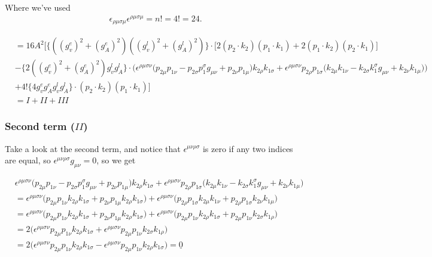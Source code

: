 \documentclass[11pt]{article}
\begin{document}
\begin{center}
Where we've used
\begin{align*}
\epsilon_{\rho \mu \sigma \mu} \epsilon^{\rho \mu \sigma \mu} = n! = 4! = 24. 
\end{align*}
\end{center}
\begin{align*}
&= 16 A^2 \Big[
 \{((g_v^e)^2 + (g_A^e)^2)  ((g_v^l)^2 + (g_A^l)^2)\} \cdot
\Big[ 2(p_2 \cdot k_2) (p_1 \cdot k_1) + 2(p_1 \cdot k_2) (p_2 \cdot k_1) \Big]\\
 &-
\{2 ((g_v^e)^2 + (g_A^e)^2) g_v^l g_A^l \} \cdot
\Big( \epsilon^{\rho \mu \sigma \nu}  \big(
p_{2\mu} p_{1 \nu} - p_{2\sigma} p_1^{ \sigma} g_{\mu\nu}
+ p_{2\nu} p_{1 \mu} \big) k_{2 \rho} k_{1 \sigma} 
+ \epsilon^{\rho \mu \sigma \nu} p_{2 \rho}  p_{1 \sigma}  \big(k_{2 \mu} k_{1 \nu}  - k_{2 \sigma} k_1^{ \sigma} g_{\mu \nu} + k_{2 \nu} k_{1 \mu}\big) \Big)\\
& +
4! \{4  g_v^e g_A^e g_v^l g_A^l  \} \cdot
(p_2 \cdot k_2) (p_1 \cdot k_1)
\Big]\\
&= I + II + III
\end{align*}

\subsubsection{Second term ($II$)}
\begin{center}
Take a look at the second term, and notice that $\epsilon^{\mu\nu \rho \sigma}$ is zero if any two indices are equal, so $\epsilon^{\mu \nu \rho \sigma} g_{\mu \nu}=0$, so we get
\begin{flushleft}
\begin{align*}
&  \epsilon^{\rho \mu \sigma \nu}  \big(
p_{2\mu} p_{1 \nu} - p_{2\sigma} p_1^{ \sigma} g_{\mu\nu}
+ p_{2\nu} p_{1 \mu} \big) k_{2 \rho} k_{1 \sigma} 
+ \epsilon^{\rho \mu \sigma \nu} p_{2 \rho}  p_{1 \sigma}  \big(k_{2 \mu} k_{1 \nu}  - k_{2 \sigma} k_1^{ \sigma} g_{\mu \nu} + k_{2 \nu} k_{1 \mu}\big) \\
&= \epsilon^{\rho \mu \sigma \nu}  \big(
p_{2\mu} p_{1 \nu}k_{2 \rho} k_{1 \sigma} 
+ p_{2\nu} p_{1 \mu} k_{2 \rho} k_{1 \sigma} \big) + \epsilon^{\rho \mu \sigma \nu} \big(
 p_{2 \rho}  p_{1 \sigma} k_{2 \mu} k_{1 \nu}  + p_{2 \rho}  p_{1 \sigma}  k_{2 \nu} k_{1 \mu}\big) \\
&= \epsilon^{\rho \mu \sigma \nu}  \big(
p_{2\mu} p_{1 \nu}k_{2 \rho} k_{1 \sigma} 
+ p_{2\nu} p_{1 \mu} k_{2 \rho} k_{1 \sigma} \big) + \epsilon^{\rho \mu  \sigma \nu } \big(
p_{2 \mu}  p_{1 \nu} k_{2 \rho} k_{1 \sigma}  + p_{2 \mu}  p_{1 \nu}  k_{2 \sigma} k_{1 \rho}\big) \\
&= 2 \big( \epsilon^{\rho \mu  \sigma \nu } 
p_{2 \mu}  p_{1 \nu} k_{2 \rho} k_{1 \sigma}  + \epsilon^{\rho \mu  \sigma \nu } p_{2 \mu}  p_{1 \nu}  k_{2 \sigma} k_{1 \rho}\big) \\
&= 2 \big( \epsilon^{\rho \mu  \sigma \nu } 
p_{2 \mu}  p_{1 \nu} k_{2 \rho} k_{1 \sigma}  
- \epsilon^{\rho \mu  \sigma \nu } p_{2 \mu}  p_{1 \nu}  k_{2 \rho} k_{1 \sigma}\big) = \underline{0} \\
\end{align*}
\end{flushleft}
\end{center}
\end{document}
